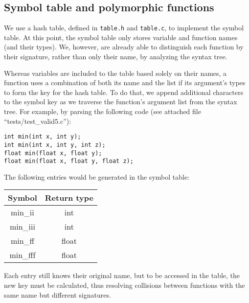 
\subsection{Symbol table and polymorphic functions}
We use a hash table, defined in \texttt{table.h} and \texttt{table.c}, to implement the symbol
table. At this point, the symbol table only stores variable and function names (and their types).
We, however, are already able to distinguish each function by their signature, rather than
only their name, by analyzing the syntax tree.

Whereas variables are included to the table based solely on their names, a function uses a
combination of both its name and the list if its argument's types to form the key for the hash
table. To do that, we append additional characters to the symbol key as we traverse the
function's argument list from the syntax tree. For example, by parsing the following code
(see attached file ``tests/test\_valid5.c''):

\begin{lstlisting}
int min(int x, int y);
int min(int x, int y, int z);
float min(float x, float y);
float min(float x, float y, float z);
\end{lstlisting}

The following entries would be generated in the symbol table:

\begin{table}[h]
 \centering
\begin{tabular}{c c}
\hline
Symbol    &   Return type \\
\hline
min\_ii    &          int \\
min\_iii   &          int \\
min\_ff    &          float \\
min\_fff   &          float  \\
\hline
\end{tabular}
\end{table}

Each entry still knows their original name, but to be accessed in the table, the
new key must be calculated, thus resolving collisions between functions with the
same name but different signatures.
